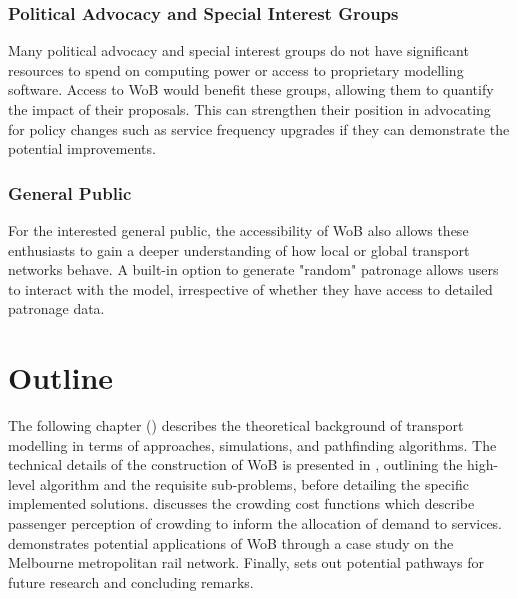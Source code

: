 \subsubsection{Political Advocacy and Special Interest Groups}
Many political advocacy and special interest groups do not have significant resources to spend on computing power or access to proprietary modelling software. Access to WoB would benefit these groups, allowing them to quantify the impact of their proposals. This can strengthen their position in advocating for policy changes such as service frequency upgrades if they can demonstrate the potential improvements. 

\subsubsection{General Public}
For the interested general public, the accessibility of WoB also allows these enthusiasts to gain a deeper understanding of how local or global transport networks behave. A built-in option to generate "random" patronage allows users to interact with the model, irrespective of whether they have access to detailed patronage data. 

\section{Outline}
The following chapter () describes the theoretical background of transport modelling in terms of approaches, simulations, and pathfinding algorithms. The technical details of the construction of WoB is presented in , outlining the high-level algorithm and the requisite sub-problems, before detailing the specific implemented solutions.  discusses the crowding cost functions which describe passenger perception of crowding to inform the allocation of demand to services.  demonstrates potential applications of WoB through a case study on the Melbourne metropolitan rail network. Finally,  sets out potential pathways for future research and concluding remarks.

